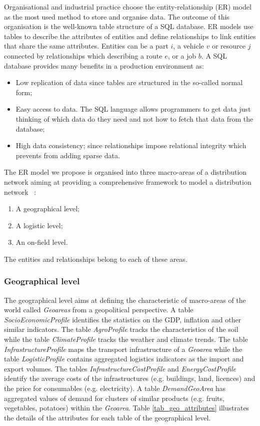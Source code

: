 Organisational and industrial practice choose the entity-relationship (ER) model as the most used method to store and organise data. The outcome of this organisation is the well-known table structure of a SQL database. ER models use tables to describe the attributes of entities and define relationships to link entities that share the same attributes. Entities can be a part $i$, a vehicle $v$ or resource $j$ connected by relationships which describing a route $e$, or a job $b$. A SQL database provides many benefits in a production environment as:
\begin{itemize}
    \item Low replication of data since tables are structured in the so-called normal form;
    \item Easy access to data. The SQL language allows programmers to get data just thinking of which data do they need and not how to fetch that data from the database;
    \item High data consistency; since relationships impose relational integrity which prevents from adding sparse data.
\end{itemize}

The ER model we propose is organised into three macro-areas of a distribution network aiming at providing a comprehensive framework to model a distribution network ~\cite{Accorsi2018}:

\begin{enumerate}
    \item A geographical level;
    \item A logistic level;
    \item An on-field level.
\end{enumerate}

The entities and relationships belong to each of these areas.
\subsubsection{Geographical level}

The geographical level aims at defining the characteristic of macro-areas of the world called \textit{Geoareas} from a geopolitical perspective. A table \textit{SocioEconomicProfile} identifies the statistics on the GDP, inflation and other similar indicators. The table \textit{AgroProfile} tracks the characteristics of the soil while the table \textit{ClimateProfile} tracks the weather and climate trends. The table \textit{InfrastructureProfile} maps the transport infrastructure of a \textit{Geoarea} while the table \textit{LogisticProfile} contains aggregated logistics indicators as the import and export volumes. The tables \textit{InfrastructureCostProfile} and \textit{EnergyCostProfile} identify the average costs of the infrastructures (e.g. buildings, land, licences) and the price for consumables (e.g. electricity). A table \textit{DemandGeoArea} has aggregated values of demand for clusters of similar products (e.g. fruits, vegetables, potatoes) within the \textit{Geoarea}. Table \ref{tab_geo_attributes} illustrates the details of the attributes for each table of the geographical level.


